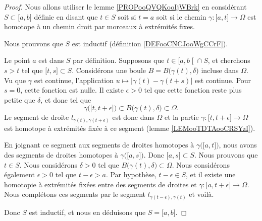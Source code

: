 \begin{proof}
	Nous allons utiliser le lemme \ref{PROPooQVQKooIjWBrk} en considérant \( S\subset \mathopen[ a , b \mathclose]\) définie en disant que \( t\in S\) soit si \( t=a\) soit si le chemin \( \gamma\colon \mathopen[ a , t \mathclose]\to \Omega \) est homotope à un chemin droit par morceaux à extrémités fixes.

	Nous prouvons que \( S\) est inductif (définition \ref{DEFooCNCJooWgCCrF}).
	\begin{subproof}
		\spitem[\( a\in S\)]
		Le point \( a\) est dans \( S\) par définition.
		\spitem[Si \( t\in S\)]
		Supposons que \( t\in \mathopen[ a , b \mathclose[\cap S\), et cherchons \( s>t\) tel que \( \mathopen[ t , s \mathclose]\subset S\). Considérons une boule \( B= B\big( \gamma(t),\delta \big)\) incluse dans \( \Omega\). Vu que \( \gamma\) est continue, l'application \( u\mapsto | \gamma(t)-\gamma(t+s) | \) est continue. Pour \( s=0\), cette fonction est nulle. Il existe \( \epsilon>0\) tel que cette fonction reste plus petite que \( \delta\), et donc tel que
		\begin{equation}
			\gamma\big( \mathopen[ t , t+\epsilon \mathclose] \big)\subset B\big( \gamma(t),\delta \big)\subset \Omega.
		\end{equation}
		Le segment de droite \( l_{\gamma(t),\gamma(t+\epsilon)} \) est donc dans \( \Omega\) et la partie \( \gamma\colon \mathopen[ t , t+\epsilon \mathclose]\to \Omega\) est homotope à extrémités fixée à ce segment (lemme \ref{LEMooTDTAooCRSYzI}).

		En joignant ce segment aux segments de droites homotopes à \(  \gamma\big( \mathopen[ a , t \mathclose] \big)  \), nous avons des segments de droites homotopes à \( \gamma\big( \mathopen[ a , s \mathclose] \big)\). Donc \( \mathopen[ a , s \mathclose]\subset S\).
		Nous prouvons que \( t\in S\). Nous considérons \( \delta>0\) tel que \( B\big( \gamma(t),\delta \big)\subset \Omega\). Nous considérons également \( \epsilon>0\) tel que \( t-\epsilon>a\). Par hypothèse, \( t-\epsilon\in S\), et il existe une homotopie à extrémités fixées entre des segments de droites et \( \gamma\colon \mathopen[ a , t+\epsilon \mathclose]\to \Omega\). Nous complétons ces segments par le segment \( l_{\gamma(t-\epsilon),\gamma(t)}\) et voilà.
	\end{subproof}
	Donc \( S\) est inductif, et nous en déduisons que \( S=\mathopen[ a , b \mathclose]\).
\end{proof}

